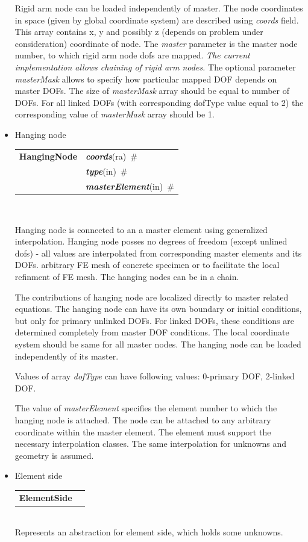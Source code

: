 \documentclass[a4paper]{article}
\makeatletter
\newcommand{\param}[1]{{\em #1}}
\newcommand{\keywordnotype}[1]{\mbox{{\it{\bf{#1}}}}}
\newcommand{\keyword}[2]{\mbox{{\keywordnotype{#1}\tiny (#2)}}}
\newcommand{\entKeywordInst}[1]{\mbox{{\bf{{#1}}}}}
\newcommand{\field}[2]{\mbox{\keyword{#1}{#2}~\#}}
\newenvironment{record}[1][]{\begin{tabular}{|ll}}{\end{tabular}\\}
\newcommand{\recentry}[2]{{#1}&{#2}\\}
\newcounter{rcc}
\newenvironment{record}[1][\textwidth]{\setcounter{rcc}{0}\begin{tabular*}{#1}{|ll@{\extracolsep{\fill}}r}}{\end{tabular*}\\}
\newcommand{\recentry}[2]{\ifthenelse{\value{rcc}>0}{&$\backslash$ \\}{\setcounter{rcc}{1}}{#1}&{#2}}
\makeatother
\begin{document}
\begin{itemize}
Rigid arm node can be loaded
independently of master. The node coordinates in space (given by
global coordinate system) are described using \param{coords}
field. This array contains x, y and possibly z (depends on problem
under consideration) coordinate of node. The \param{master} parameter is the
master node number, to which rigid arm node dofs are mapped.
{\em The current implementation allows chaining of rigid arm nodes.}
The optional parameter \param{masterMask} allows to specify how
particular mapped DOF depends on master DOFs. The size of \param{masterMask} array
should be equal to number of DOFs. For all linked DOFs (with
corresponding dofType value equal to 2) the corresponding value of
\param{masterMask} array should be 1.

\item Hanging node

  \begin{record}[0.9\textwidth]
    \recentry{\entKeywordInst{HangingNode}}{\field{coords}{ra}}
    \recentry{}{\field{type}{in}} \recentry{}{\field{masterElement}{in}}
  \end{record}

Hanging node is connected to an a master element using generalized interpolation.
Hanging node posses no degrees of freedom (except unlined dofs) - all values are
interpolated from corresponding master elements and its DOFs.
arbitrary FE mesh of concrete specimen or to facilitate the local
refinment of FE mesh. The hanging nodes can be in a chain.

The contributions of hanging node are localized directly to master related equations.
The hanging node can have its own boundary or initial conditions, but
only for primary unlinked DOFs. For linked DOFs, these conditions are
determined completely from master DOF conditions.
The local coordinate system should be same for all master nodes.
The hanging node can be loaded independently of its master.

Values of array \param{dofType} can have following values:
0-primary DOF, 2-linked DOF.

The value of \param{masterElement} specifies the element number to which the hanging node is attached. 
The node can be attached to any arbitrary coordinate within the master element.
The element must support the necessary interpolation classes.
The same interpolation for unknowns and geometry is assumed.

\item Element side

  \begin{record}[0.9\textwidth]
    \recentry{\entKeywordInst{ElementSide}}{}
  \end{record}
  Represents an abstraction for element side, which holds some unknowns.
\end{itemize}
\end{document}
